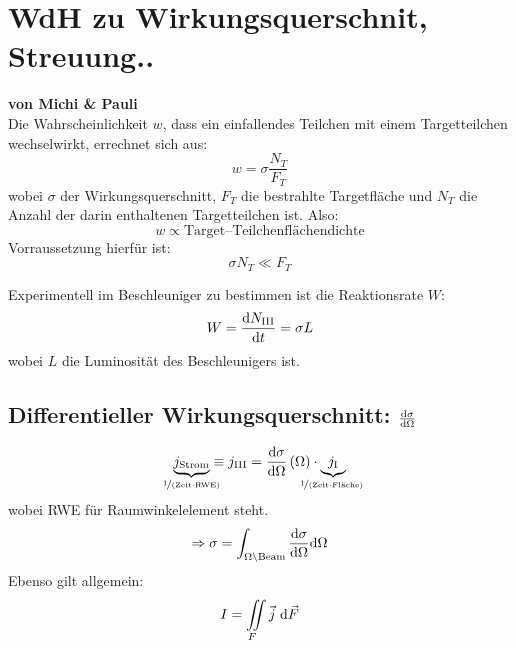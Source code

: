 \documentclass[Ex4_Zusammenfassung.tex]{subfiles}
\begin{document}
\section{WdH zu Wirkungsquerschnit, Streuung..}
\textbf{von Michi \& Pauli}\\

Die Wahrscheinlichkeit $w$, dass ein einfallendes Teilchen mit einem Targetteilchen wechselwirkt, errechnet sich aus:
\begin{equation}
	w = \sigma \frac{N_T}{F_T}
\end{equation}
wobei $\sigma$ der Wirkungsquerschnitt,  $F_T$ die bestrahlte Targetfläche und $N_T$ die Anzahl der darin enthaltenen Targetteilchen ist. Also:
\begin{equation*}
	w \propto \text{Target--Teilchenflächendichte}
\end{equation*}
Vorraussetzung hierfür ist:
\begin{equation*}
	\sigma N_T \ll F_T
\end{equation*}

Experimentell im Beschleuniger zu bestimmen ist die Reaktionsrate $W$: 
\begin{equation}
	W = \frac{\md N_{\text{\rom{3}}}}{\md t} = \sigma L
\end{equation}
wobei $L$ die Luminosität des Beschleunigers ist.\\

\subsection*{Differentieller Wirkungsquerschnitt: $\frac{\mathrm{d} \sigma}{\mathrm{d} \Omega}$}
\begin{equation}
	\underbrace{j_{\text{Strom}}}_{\mathclap{\nicefrac{1}{\text{(Zeit$\cdot$RWE)} }} } \equiv j_{\text{\rom{3}}} = \derive{\sigma}{\Omega} \lp \Omega \rp \cdot \underbrace{j_{\text{\rom{1}}}}_{\mathclap{\nicefrac{1}{\text{(Zeit$\cdot$Fläche) }} } } 
\end{equation}
wobei RWE für Raumwinkelelement steht. 
\begin{equation}
	\Rightarrow \sigma = \int_{\Omega \setminus \text{Beam} }\frac{\mathrm{d} \sigma}{\mathrm{d} \Omega} \mathrm{d} \Omega
\end{equation}
Ebenso gilt allgemein:
\begin{equation}
	I = \mathop{\int \kern -0.7em \int}_{\kern -0.6em F} \vec{j}\ \mathrm{d} \vec{F}
\end{equation}
\end{document}
